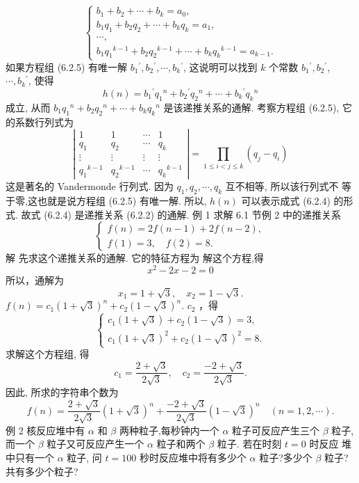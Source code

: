 \documentclass{report}
\begin{document}
	$$
	\left\{\begin{array}{l}
	b_1+b_2+\cdots+b_k=a_0, \\
	b_1 q_1+b_2 q_2+\cdots+b_k q_k=a_1, \\
	\cdots, \\
	b_1 q_1{ }^{k-1}+b_2 q_2{ }^{k-1}+\cdots+b_k q_k{ }^{k-1}=a_{k-1} .
	\end{array}\right.
	$$
	如果方程组 (6.2.5) 有唯一解 $b_1{ }^{\prime}, b_2{ }^{\prime}, \cdots, b_k{ }^{\prime}$, 这说明可以找到 $k$ 个常数 $b_1{ }^{\prime}, b_2{ }^{\prime}$, $\cdots, b_k{ }^{\prime}$, 使得
	$$
	h(n)=b_1{ }^{\prime} q_1{ }^n+b_2{ }^{\prime} q_2{ }^n+\cdots+b_k{ }^{\prime} q_k{ }^n
	$$
	成立, 从而 $b_1 q_1{ }^n+b_2 q_2{ }^n+\cdots+b_k q_k{ }^n$ 是该递推关系的通解. 考察方程组 (6.2.5), 它的系数行列式为$$
	\left|\begin{array}{cccc}
	1 & 1 & \cdots & 1 \\
	q_1 & q_2 & \cdots & q_k \\
	\vdots & \vdots & \vdots & \vdots \\
	q_1{ }^{k-1} & q_2{ }^{k-1} & \cdots & q_k{ }^{k-1}
	\end{array}\right|=\prod_{1 \leqslant i<j \leqslant k}\left(q_j-q_i\right)
	$$
	这是著名的 Vandermonde 行列式. 因为 $q_1, q_2, \cdots, q_k$ 互不相等, 所以该行列式不 等于零,这也就是说方程组 (6.2.5) 有唯一解. 所以, $h(n)$ 可以表示成式 (6.2.4) 的形式.
	故式 (6.2.4) 是递推关系 (6.2.2) 的通解.
	例 1 求解 6.1 节例 2 中的递推关系
	$$
	\left\{\begin{array}{l}
	f(n)=2 f(n-1)+2 f(n-2), \\
	f(1)=3, \quad f(2)=8 .
	\end{array}\right.
	$$
	解 先求这个递推关系的通解. 它的特征方程为
	解这个方程,得
	$$
	x^2-2 x-2=0
	$$
	所以，通解为
	$$
	x_1=1+\sqrt{3}, \quad x_2=1-\sqrt{3} .
	$$
	$f(n)=c_1(1+\sqrt{3})^n+c_2(1-\sqrt{3})^n$.
	$c_2$ ，得
	$$
	\left\{\begin{array}{l}
	c_1(1+\sqrt{3})+c_2(1-\sqrt{3})=3, \\
	c_1(1+\sqrt{3})^2+c_2(1-\sqrt{3})^2=8 .
	\end{array}\right.
	$$
	求解这个方程组, 得
	$$
	c_1=\frac{2+\sqrt{3}}{2 \sqrt{3}}, \quad c_2=\frac{-2+\sqrt{3}}{2 \sqrt{3}} .
	$$
	因此, 所求的字符串个数为
	$$
	f(n)=\frac{2+\sqrt{3}}{2 \sqrt{3}}(1+\sqrt{3})^n+\frac{-2+\sqrt{3}}{2 \sqrt{3}}(1-\sqrt{3})^n \quad(n=1,2, \cdots) .
	$$
	例 2 核反应堆中有 $\alpha$ 和 $\beta$ 两种粒子,每秒钟内一个 $\alpha$ 粒子可反应产生三个 $\beta$ 粒子,而一个 $\beta$ 粒子又可反应产生一个 $\alpha$ 粒子和两个 $\beta$ 粒子. 若在时刻 $t=0$ 时反应 堆中只有一个 $\alpha$ 粒子, 问 $t=100$ 秒时反应堆中将有多少个 $\alpha$ 粒子?多少个 $\beta$ 粒子? 共有多少个粒子?
\end{document}
